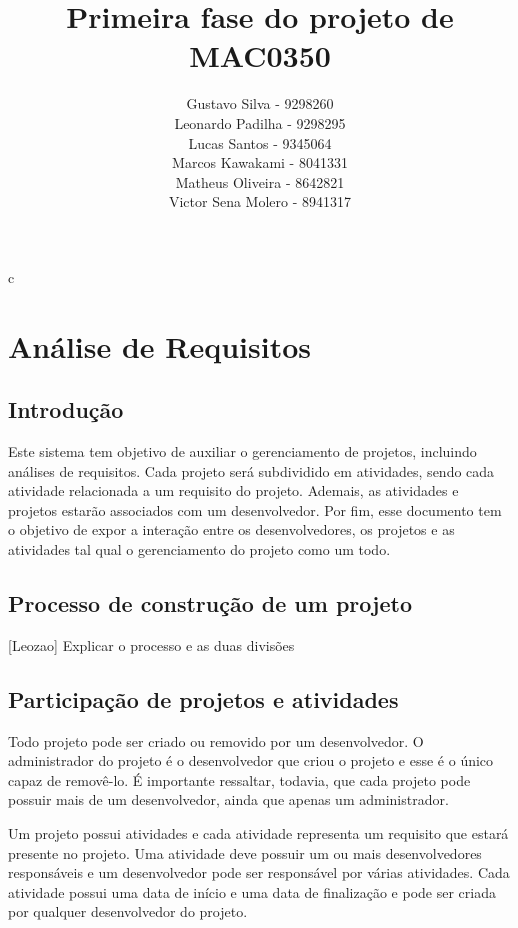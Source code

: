 c\documentclass{article}
\title{Primeira fase do projeto de MAC0350}
\author{Gustavo Silva - 9298260\\Leonardo Padilha - 9298295 \\Lucas Santos - 9345064 \\Marcos Kawakami - 8041331 \\Matheus Oliveira - 8642821 \\Victor Sena Molero - 8941317}
\date{}
\begin{document}
\maketitle


\section{Análise de Requisitos}

	\subsection{Introdução}
	Este sistema tem objetivo de auxiliar o gerenciamento de projetos, incluindo análises de requisitos. Cada projeto será subdividido em atividades, sendo cada atividade relacionada a um requisito do projeto. Ademais, as atividades e projetos estarão associados com um desenvolvedor. Por fim, esse documento tem o objetivo de expor a interação entre os desenvolvedores, os projetos e as atividades tal qual o gerenciamento do projeto como um todo.

	\subsection{Processo de construção de um projeto}
	[Leozao] Explicar o processo e as duas divisões

	\subsection{Participação de projetos e atividades}
	Todo projeto pode ser criado ou removido por um desenvolvedor. O administrador do projeto é o desenvolvedor que criou o projeto e esse é o único capaz de removê-lo. É importante ressaltar, todavia, que cada projeto pode possuir mais de um desenvolvedor, ainda que apenas um administrador.

	Um projeto possui atividades e cada atividade representa um requisito que estará presente no projeto. Uma atividade deve possuir um ou mais desenvolvedores responsáveis e um desenvolvedor pode ser responsável por várias atividades. Cada atividade possui uma data de início e uma data de finalização e pode ser criada por qualquer desenvolvedor do projeto.
\end{document}
